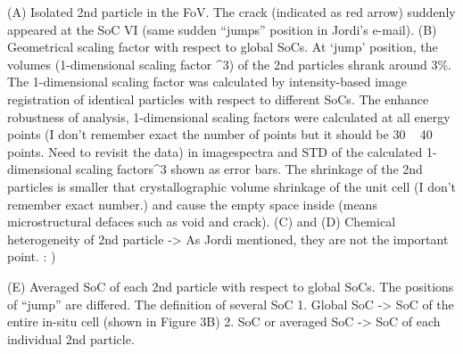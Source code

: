 \documentclass{article}
\begin{document}
(A) Isolated 2nd particle in the FoV. The crack (indicated as red
arrow) suddenly appeared at the SoC VI (same sudden ``jumps'' position
in Jordi's e-mail). (B) Geometrical scaling factor with respect to
global SoCs. At ‘jump’ position, the volumes (1-dimensional scaling
factor \textasciicircum3) of the 2nd particles shrank around 3\%. The 1-dimensional
scaling factor was calculated by intensity-based image registration of
identical particles with respect to different SoCs. The enhance
robustness of analysis, 1-dimensional scaling factors were calculated
at all energy points (I don't remember exact the number of points but
it should be 30 ~ 40 points. Need to revisit the data) in imagespectra
and STD of the calculated 1-dimensional scaling factors\^{}3 shown as
error bars.  The shrinkage of the 2nd particles is smaller that
crystallographic volume shrinkage of the unit cell (I don't remember
exact number.) and cause the empty space inside (means microstructural
defaces such as void and crack).  (C) and (D) Chemical heterogeneity
of 2nd particle -> As Jordi mentioned, they are not the important
point. : )

(E) Averaged SoC of each 2nd particle with respect to global
SoCs. The positions of ``jump'' are differed.  The definition of
several SoC 1. Global SoC -> SoC of the entire in-situ cell (shown
in Figure 3B) 2. SoC or averaged SoC -> SoC of each individual 2nd
particle.
\end{document}
